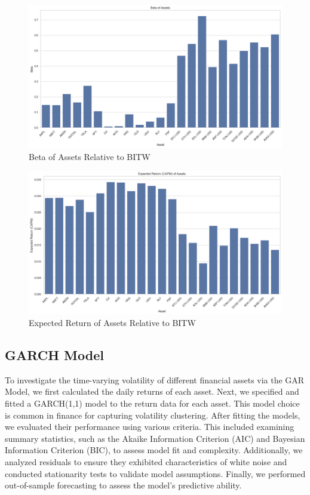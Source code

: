 \begin{figure}
    \centering
    \includegraphics[width=\textwidth]{./code/risk-and-return-analysis/capm/beta_assets.png}
    \caption{Beta of Assets Relative to BITW}
    \label{fig:beta}
\end{figure}

\begin{figure}
    \centering
    \includegraphics[width=\textwidth]{./code/risk-and-return-analysis/capm/exp_return_assets.png}
    \caption{Expected Return of Assets Relative to BITW}
    \label{fig:exp_return}
\end{figure}


\subsection{GARCH Model}

To investigate the time-varying volatility of different financial assets via the GAR Model, we first calculated the daily returns of each asset. Next, we specified and fitted a GARCH(1,1) model to the return data for each asset. This model choice is common in finance for capturing volatility clustering. After fitting the models, we evaluated their performance using various criteria. This included examining summary statistics, such as the Akaike Information Criterion (AIC) and Bayesian Information Criterion (BIC), to assess model fit and complexity. Additionally, we analyzed residuals to ensure they exhibited characteristics of white noise and conducted stationarity tests to validate model assumptions. Finally, we performed out-of-sample forecasting to assess the model's predictive ability.

